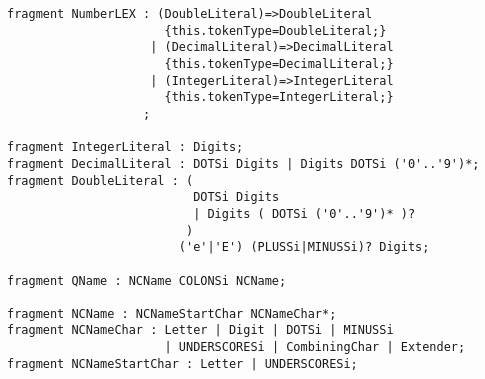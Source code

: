 \begin{verbatim}
fragment NumberLEX : (DoubleLiteral)=>DoubleLiteral
                      {this.tokenType=DoubleLiteral;}
                    | (DecimalLiteral)=>DecimalLiteral
                      {this.tokenType=DecimalLiteral;}
                    | (IntegerLiteral)=>IntegerLiteral
                      {this.tokenType=IntegerLiteral;}
                   ;
                  
fragment IntegerLiteral : Digits;
fragment DecimalLiteral : DOTSi Digits | Digits DOTSi ('0'..'9')*;
fragment DoubleLiteral : (
                          DOTSi Digits 
                          | Digits ( DOTSi ('0'..'9')* )? 
                         ) 
                        ('e'|'E') (PLUSSi|MINUSSi)? Digits;

fragment QName : NCName COLONSi NCName;

fragment NCName : NCNameStartChar NCNameChar*;
fragment NCNameChar : Letter | Digit | DOTSi | MINUSSi  
                      | UNDERSCORESi | CombiningChar | Extender;
fragment NCNameStartChar : Letter | UNDERSCORESi;



\end{verbatim}
